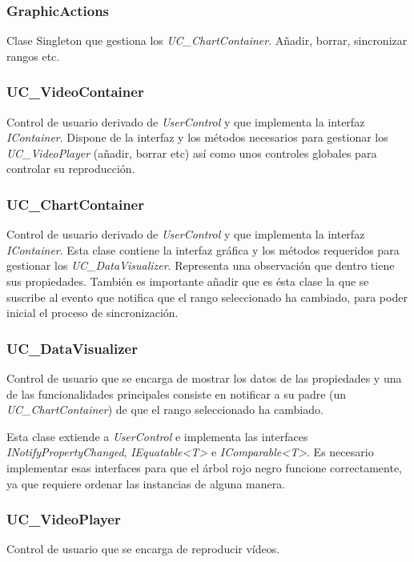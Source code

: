 \subsubsection{GraphicActions}
Clase Singleton que gestiona los \emph{UC\_ChartContainer}. A\~nadir, borrar, sincronizar rangos etc.

\subsubsection{UC\_VideoContainer}
Control de usuario derivado de \emph{UserControl} y que implementa
la interfaz \emph{IContainer}. Dispone de la interfaz y los m\'etodos necesarios para
gestionar los \emph{UC\_VideoPlayer} (a\~nadir, borrar etc) as\'i como unos controles globales
para controlar su reproducci\'on.

\subsubsection{UC\_ChartContainer}
Control de usuario derivado de \emph{UserControl} y que implementa la interfaz
\emph{IContainer}. Esta clase contiene la interfaz gr\'afica y los m\'etodos requeridos para gestionar
los \emph{UC\_DataVisualizer}. Representa una observaci\'on que dentro tiene sus propiedades.
Tambi\'en es importante a\~nadir que es \'esta clase la que se suscribe al evento que notifica
que el rango seleccionado ha cambiado, para poder inicial el proceso de sincronizaci\'on.

\subsubsection{UC\_DataVisualizer}
Control de usuario que se encarga de mostrar los datos de las propiedades y una de las funcionalidades
principales consiste en notificar a su padre (un \emph{UC\_ChartContainer}) de que el rango seleccionado ha cambiado.

Esta clase extiende a \emph{UserControl} e implementa las interfaces \emph{INotifyPropertyChanged},
\emph{IEquatable<T>} e \emph{IComparable<T>}. Es necesario implementar
esas interfaces para que el \'arbol rojo negro funcione correctamente, ya que requiere ordenar las instancias
de alguna manera. 

\subsubsection{UC\_VideoPlayer}
Control de usuario que se encarga de reproducir v\'ideos.

